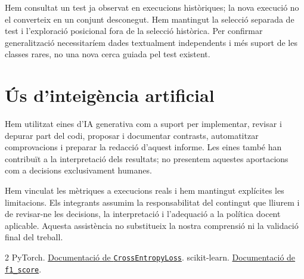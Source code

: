 \documentclass[11pt,a4paper]{article}
\begin{document}
Hem consultat un test ja observat en execucions històriques; la nova execució no el converteix en un conjunt desconegut. Hem mantingut la selecció separada de test i l'exploració posicional fora de la selecció històrica. Per confirmar generalització necessitaríem dades textualment independents i més suport de les classes rares, no una nova cerca guiada pel test existent.

\section{Ús d'\texorpdfstring{inte\lgem{}igència}{intel·ligència} artificial}
Hem utilitzat eines d'IA generativa com a suport per implementar, revisar i depurar part del codi, proposar i documentar contrasts, automatitzar comprovacions i preparar la redacció d'aquest informe. Les eines també han contribuït a la interpretació dels resultats; no presentem aquestes aportacions com a decisions exclusivament humanes.

Hem vinculat les mètriques a execucions reals i hem mantingut explícites les limitacions. Els integrants assumim la responsabilitat del contingut que lliurem i de revisar-ne les decisions, la interpretació i l'adequació a la política docent aplicable. Aquesta assistència no substitueix la nostra comprensió ni la validació final del treball.

{\small
\begin{thebibliography}{2}
\setlength{\itemsep}{0pt}
 PyTorch. \href{https://docs.pytorch.org/docs/stable/generated/torch.nn.CrossEntropyLoss.html}{Documentació de \texttt{CrossEntropyLoss}}.
 scikit-learn. \href{https://scikit-learn.org/stable/modules/generated/sklearn.metrics.f1_score.html}{Documentació de \texttt{f1\_score}}.
\end{thebibliography}
}
\end{document}
